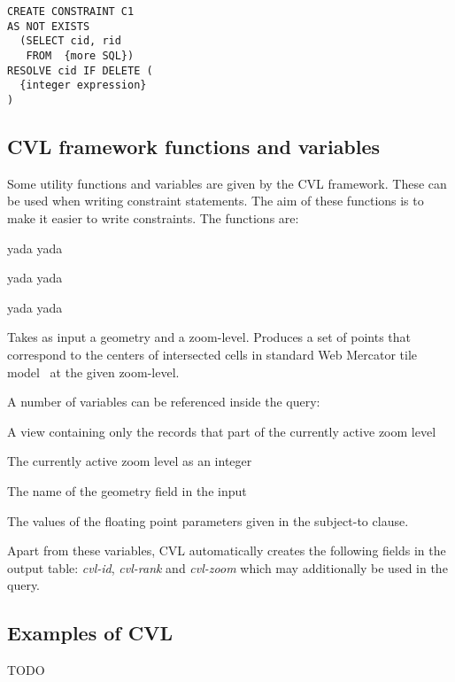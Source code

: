 \begin{lstlisting}
CREATE CONSTRAINT C1
AS NOT EXISTS
  (SELECT cid, rid
   FROM  {more SQL})
RESOLVE cid IF DELETE (
  {integer expression}
)

\end{lstlisting}

\subsection{CVL framework functions and variables}



Some utility functions and variables are given by the CVL framework. These can be used when writing constraint statements. The aim of these functions is to make it easier to write constraints. The functions are:

 yada yada

 yada yada

 yada yada

Takes as input a geometry and a zoom-level. Produces a set of points that correspond to the centers of intersected cells in standard Web Mercator tile model~\cite{osm?} at the given zoom-level.

A number of variables can be referenced inside the query:

 A view containing only the records that part of the currently active zoom level

 The currently active zoom level as an integer

 The name of the geometry field in the input

 The values of the floating point parameters given in the subject-to clause.

Apart from these variables, CVL automatically creates the following fields in the output table: \emph{cvl-id}, \emph{cvl-rank} and \emph{cvl-zoom} which may additionally be used in the query.

\subsection{Examples of CVL}

TODO
